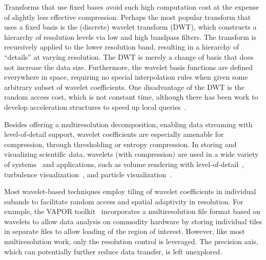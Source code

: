 Transforms that use fixed bases avoid such high computation cost at the expense of slightly less
effective compression. Perhaps the most popular transform that uses a fixed basis is the (discrete)
wavelet transform (DWT), which constructs a hierarchy of resolution levels via low and high bandpass
filters. The transform is recursively applied to the lower resolution band, resulting in a hierarchy
of ``details'' at varying resolution. The DWT is merely a change of basis that does not increase the
data size. Furthermore, the wavelet basis functions are defined everywhere in space, requiring no
special interpolation rules when given some arbitrary subset of wavelet coefficients. One
disadvantage of the DWT is the random access cost, which is not constant time, although there has
been work to develop acceleration structures to speed up local queries~\cite{weiss}.

Besides offering a multiresolution decomposition, enabling data streaming with level-of-detail
support, wavelet coefficients are especially amenable for compression, through thresholding or
entropy compression. In storing and visualizing scientific data, wavelets (with compression) are
used in a wide variety of systems~\cite{multires_toolkit2003,vapor2007,woodring2011} and
applications, such as volume rendering with
level-of-detail~\cite{wavelet-compression-interactive-vis,multires-framework,rapid-compression-volume,interactive-rendering-large-volume,multires-volume-rendering},
turbulence visualization~\cite{treib}, and particle visualization~\cite{sph-octree}.

Most wavelet-based techniques employ tiling of wavelet coefficients in individual subands to
facilitate random access and spatial adaptivity in resolution. For example, the VAPOR
toolkit~\cite{vapor2007} incorporates a multiresolution file format based on wavelets to allow
data analysis on commodity hardware by storing individual tiles in separate files to allow loading
of the region of interest. However, like most multiresolution work, only the resolution control is
leveraged. The precision axis, which can potentially further reduce data transfer, is left
unexplored.

